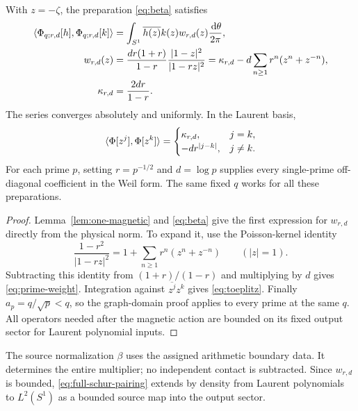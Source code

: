 \begin{theorem}
\label{thm:schur-prime}
With $z=-\zeta$, the preparation \eqref{eq:beta} satisfies
\begin{align}
 \langle \Phi_{q;r,d}[h],\Phi_{q;r,d}[k]\rangle
 &=\int_{S^1}\overline{h(z)}k(z)w_{r,d}(z)\frac{\,\mathrm d\theta}{2\pi},
 \label{eq:full-schur-pairing}\\
 w_{r,d}(z)&=\frac{dr(1+r)}{1-r}\frac{|1-z|^2}{|1-rz|^2}
 =\kappa_{r,d}-d\sum_{n\geq1}r^n(z^n+z^{-n}),
 \label{eq:prime-weight}\\
 \kappa_{r,d}&=\frac{2dr}{1-r}.
 \label{eq:kappa}
\end{align}
The series converges absolutely and uniformly. In the Laurent basis,
\begin{equation}\label{eq:toeplitz}
 \langle \Phi[z^j],\Phi[z^k]\rangle=
 \begin{cases}
  \kappa_{r,d},&j=k,\\
  -dr^{|j-k|},&j\ne k.
 \end{cases}
\end{equation}
For each prime $p$, setting $r=p^{-1/2}$ and $d=\log p$ supplies every
single-prime off-diagonal coefficient in the Weil form. The same fixed
$q$ works for all these preparations.
\end{theorem}
\begin{proof}
Lemma~\ref{lem:one-magnetic} and \eqref{eq:beta} give the first expression
for $w_{r,d}$ directly from the physical norm. To expand it, use the
Poisson-kernel identity
\begin{equation}\label{eq:poisson}
 \frac{1-r^2}{|1-rz|^2}=1+\sum_{n\geq1}r^n(z^n+z^{-n})
 \qquad (|z|=1).
\end{equation}
Subtracting this identity from $(1+r)/(1-r)$ and multiplying by $d$
gives \eqref{eq:prime-weight}. Integration against
$\overline{z^j}z^k$ gives \eqref{eq:toeplitz}. Finally
$a_p=q/\sqrt p<q$, so the graph-domain proof applies to every prime
at the same $q$. All operators needed after the magnetic action are
bounded on its fixed output sector for Laurent polynomial inputs.
\end{proof}

The source normalization $\beta$ uses the assigned arithmetic boundary
data. It determines the entire multiplier; no independent contact is
subtracted. Since $w_{r,d}$ is bounded, \eqref{eq:full-schur-pairing}
extends by density from Laurent polynomials to $L^2(S^1)$ as a
bounded source map into the output sector.

